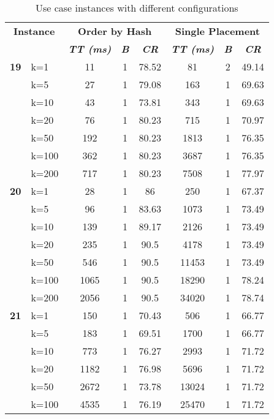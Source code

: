 \begin{table}[htbp]
    \caption{Use case instances with different configurations}
    \begin{tabular}{ll|ccc|ccc}
    
    \multicolumn{ 2}{c|}{\textbf{Instance}} & \multicolumn{ 3}{c|}{\textbf{Order by Hash}} & \multicolumn{ 3}{c}{\textbf{Single Placement}} \\ 
    \multicolumn{ 2}{l|}{} & \textbf{\textit{TT (ms)}} & \textbf{\textit{B}} & \textbf{\textit{CR}} & \textbf{\textit{TT (ms)}} & \textbf{\textit{B}} & \textbf{\textit{CR}} \\ \hline
    \multicolumn{1}{r}{\textbf{19}} & k=1 & 11 & 1 & 78.52 & 81 & 2 & 49.14 \\ 
     & k=5 & 27 & 1 & 79.08 & 163 & 1 & 69.63 \\ 
     & k=10 & 43 & 1 & 73.81 & 343 & 1 & 69.63 \\ 
     & k=20 & 76 & 1 & 80.23 & 715 & 1 & 70.97 \\ 
     & k=50 & 192 & 1 & 80.23 & 1813 & 1 & 76.35 \\ 
     & k=100 & 362 & 1 & 80.23 & 3687 & 1 & 76.35 \\ 
     & k=200 & 717 & 1 & 80.23 & 7508 & 1 & 77.97 \\ \hline
    \multicolumn{1}{r}{\textbf{20}} & k=1 & 28 & 1 & 86 & 250 & 1 & 67.37 \\ 
     & k=5 & 96 & 1 & 83.63 & 1073 & 1 & 73.49 \\ 
     & k=10 & 139 & 1 & 89.17 & 2126 & 1 & 73.49 \\ 
     & k=20 & 235 & 1 & 90.5 & 4178 & 1 & 73.49 \\ 
     & k=50 & 546 & 1 & 90.5 & 11453 & 1 & 73.49 \\ 
     & k=100 & 1065 & 1 & 90.5 & 18290 & 1 & 78.24 \\ 
     & k=200 & 2056 & 1 & 90.5 & 34020 & 1 & 78.74 \\ \hline
    \multicolumn{1}{r}{\textbf{21}} & k=1 & 150 & 1 & 70.43 & 506 & 1 & 66.77 \\ 
     & k=5 & 183 & 1 & 69.51 & 1700 & 1 & 66.77 \\ 
     & k=10 & 773 & 1 & 76.27 & 2993 & 1 & 71.72 \\ 
     & k=20 & 1182 & 1 & 76.98 & 5696 & 1 & 71.72 \\ 
     & k=50 & 2672 & 1 & 73.78 & 13024 & 1 & 71.72 \\ 
     & k=100 & 4535 & 1 & 76.19 & 25470 & 1 & 71.72 \\ 

\end{tabular}
\end{table}
